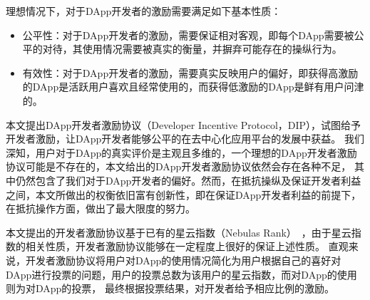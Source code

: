 理想情况下，对于DApp开发者的激励需要满足如下基本性质：
\begin{itemize}
\item 公平性：对于DApp开发者的激励，需要保证相对客观，即每个DApp需要被公平的对待，其使用情况需要被真实的衡量，并摒弃可能存在的操纵行为。
\item 有效性：对于DApp开发者的激励，需要真实反映用户的偏好，即获得高激励的DApp是活跃用户喜欢且经常使用的，而获得低激励的DApp是鲜有用户问津的。
\begin{comment}
	\item 公开性：链上的DApp激励协议与传统的评奖方式最大的不同在于，所有的评分机制必须是完全公开的，
	且其中任何统计、计算、评选的过程都是全程可见的。
	这样就杜绝了传统中心化评奖暗箱操作的可能。同时也不会出现票数统计出错等情况。
	最后，根据评选结果分配奖励的过程也会保证被执行，奖励分配正如链上交易一样可被追溯。
	\item 有效性：这也是任何评选机制所要满足的基本性质。我们期望DApp评分能够真实反映用户的评价，
	即排名高的DApp是活跃用户所喜欢的且经常被调用的，而评分低的DApp是用户鲜有问津的。
	\item 抗作弊：对于任何排名算法，都需要解决各类作弊问题。对于DIP而言，主要存在以下两类作弊问题。
	\begin{enumerate}
		\item 女巫攻击：区块链技术的一个重大特点就是一个用户建立新的节点边际成本很低。所以一个用户有可能建立多个由他控制的地址，并将他们伪装成多个正常用户来参与评选。
		一个好的激励协议应当保证每个用户无法通过女巫攻击带来巨大额外收益。
		\item 收买：由于我们衡量DApp好坏的主要指标是活跃用户调用的次数，一个DApp开发者有可能收买大量用户让他们调用自己的DApp以提高其排名从而获得更多奖励。
		这种作弊方式原则上无法杜绝，但我们期望激励协议能够让此类收买需要付出的代价变得很高以减少其出现的概率。
	\end{enumerate}
\end{comment}
\end{itemize}


本文提出DApp开发者激励协议（Developer Incentive Protocol，DIP），试图给予开发者激励，让DApp开发者能够公平的在去中心化应用平台的发展中获益。
我们深知，用户对于DApp的真实评价是主观且多维的，一个理想的DApp开发者激励协议可能是不存在的，本文给出的DApp开发者激励协议依然会存在各种不足，
其中仍然包含了我们对于DApp开发者的偏好。然而，在抵抗操纵及保证开发者利益之间，本文所做出的权衡依旧富有创新性，即在保证DApp开发者利益的前提下，在抵抗操作方面，做出了最大限度的努力。

本文提出的开发者激励协议基于已有的星云指数（Nebulas Rank）~\cite{Nebulasyellowpaper}，由于星云指数的相关性质，开发者激励协议能够在一定程度上很好的保证上述性质。
直观来说，开发者激励协议将用户对DApp的使用情况简化为用户根据自己的喜好对DApp进行投票的问题，用户的投票总数为该用户的星云指数，而对DApp的使用则为对DApp的投票，
最终根据投票结果，对开发者给予相应比例的激励。

